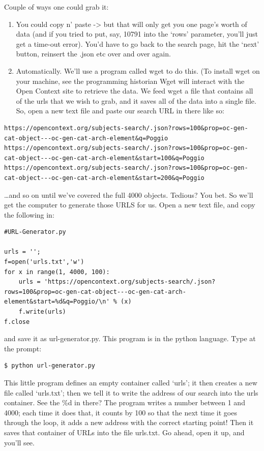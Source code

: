 \documentclass[english,]{book}
\providecommand{\tightlist}{%
  \setlength{\itemsep}{0pt}\setlength{\parskip}{0pt}}
\begin{document}
Couple of ways one could grab it:

\begin{enumerate}
\def\labelenumi{\arabic{enumi}.}
\tightlist
\item
  You could copy n' paste -\textgreater{} but that will only get you one
  page's worth of data (and if you tried to put, say, 10791 into the
  `rows' parameter, you'll just get a time-out error). You'd have to go
  back to the search page, hit the `next' button, reinsert the .json etc
  over and over again.
\item
  Automatically. We'll use a program called wget to do this. (To install
  wget on your machine, see the programming historian Wget will interact
  with the Open Context site to retrieve the data. We feed wget a file
  that contains all of the urls that we wish to grab, and it saves all
  of the data into a single file. So, open a new text file and paste our
  search URL in there like so:
\end{enumerate}

\begin{verbatim}
https://opencontext.org/subjects-search/.json?rows=100&prop=oc-gen-cat-object---oc-gen-cat-arch-element&q=Poggio
https://opencontext.org/subjects-search/.json?rows=100&prop=oc-gen-cat-object---oc-gen-cat-arch-element&start=100&q=Poggio
https://opencontext.org/subjects-search/.json?rows=100&prop=oc-gen-cat-object---oc-gen-cat-arch-element&start=200&q=Poggio
\end{verbatim}

\ldots{}and so on until we've covered the full 4000 objects. Tedious?
You bet. So we'll get the computer to generate those URLS for us. Open a
new text file, and copy the following in:

\begin{verbatim}
#URL-Generator.py

urls = '';
f=open('urls.txt','w')
for x in range(1, 4000, 100):
    urls = 'https://opencontext.org/subjects-search/.json?rows=100&prop=oc-gen-cat-object---oc-gen-cat-arch-element&start=%d&q=Poggio/\n' % (x)
    f.write(urls)
f.close
\end{verbatim}

and save it as url-generator.py. This program is in the python language.
Type at the prompt:

\begin{verbatim}
$ python url-generator.py
\end{verbatim}

This little program defines an empty container called `urls'; it then
creates a new file called `urls.txt'; then we tell it to write the
address of our search into the urls container. See the \%d in there? The
program writes a number between 1 and 4000; each time it does that, it
counts by 100 so that the next time it goes through the loop, it adds a
new address with the correct starting point! Then it saves that
container of URLs into the file urls.txt. Go ahead, open it up, and
you'll see.
\end{document}
